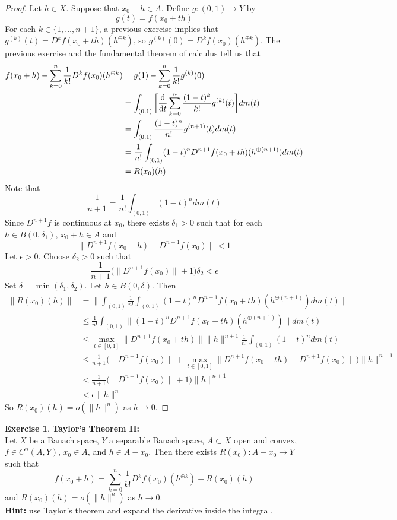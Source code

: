 \documentclass[12pt]{amsart}
\theoremstyle{definition}
\newtheorem{ex}[definition]{Exercise}
\newcommand{\del}{\delta}
\newcommand{\ep}{\epsilon}
\newcommand{\lex}[1]{\label{ex:#1}}
\begin{document}
	\begin{proof}
	Let $h \in X$. Suppose that $x_0 + h \in A$. Define $g: (0,1) \rightarrow Y$ by 
	$$g(t) = f(x_0 +t h)$$ 
	For each $k \in \{1, \dots, n+1\}$, a previous exercise implies that $g^{(k)}(t) = D^kf(x_0 + th)(h^{\oplus k})$, so $g^{(k)}(0) = D^kf(x_0)(h^{\oplus k})$. The previous exercise and the fundamental theorem of calculus tell us that 
	\begin{align*}
	f(x_0 +h) - \sum_{k=0}^{n} \frac{1}{k!}D^kf(x_0)(h^{\oplus k})
	&= g(1) - \sum_{k=0}^{n} \frac{1}{k!}g^{(k)}(0)\\
	&= \int_{(0,1)} \bigg [\dv{t} \sum_{k=0}^{n} \frac{(1-t)^k}{k!}g^{(k)}(t)\bigg ] dm(t) \\
	&= \int_{(0,1)} \frac{(1-t)^{n}}{n!}g^{(n+1)}(t) dm(t) \\
	&= \frac{1}{n!}\int_{(0,1)} (1-t)^{n}D^{n+1}f(x_0 + th)(h^{\oplus (n+1)})d m(t) \\
	&= R(x_0)(h)
	\end{align*}	
	Note that $$\frac{1}{n+1} = \frac{1}{n!}\int_{(0,1)} (1-t)^{n} dm(t)$$ 
	Since $D^{n+1}f$ is continuous at $x_0$, there exists $\del_1 >0$ such that for each $h \in B(0, \del_1)$, $x_0 + h \in A$ and 
	$$\|D^{n+1} f(x_0+h) - D^{n+1}f(x_0)\| < 1 $$  
	Let $\ep >0$. Choose $\del_2 >0$ such that $$\frac{1}{n+1} \bigg( \|D^{n+1}f(x_0 )\|  +  1 \bigg) \del_2 < \ep$$ Set $\del = \min(\del_1, \del_2)$. Let $h \in B(0, \del)$. Then
	\begin{align*}
	\|R(x_0)(h)\| 
	&= \bigg \| \int_{(0,1)} \frac{1}{n!}\int_{(0,1)} (1-t)^{n}D^{n+1}f(x_0 + th)(h^{\oplus (n+1)})d m(t) \bigg\| \\
	&\leq \frac{1}{n!}\int_{(0,1)} \|(1-t)^{n}D^{n+1}f(x_0 + th)(h^{\oplus (n+1)}) \|dm(t)\\
	&\leq \max_{t \in [0,1]}\|D^{n+1}f(x_0 + th)\| \|h\|^{n+1} \frac{1}{n!}\int_{(0,1)} (1-t)^{n} dm(t)  \\
	&\leq \frac{1}{n+1}  \bigg(\|D^{n+1}f(x_0 )\| +  \max_{t \in [0,1]} \|D^{n+1} f(x_0+th) - D^{n+1}f(x_0)\| \bigg)\|h\|^{n+1}  \\
	&< \frac{1}{n+1}\bigg(\|D^{n+1}f(x_0 )\|  +  1 \bigg)\|h\|^{n+1}  \\
	&<\ep \|h\|^n
	\end{align*}
	So $R(x_0)(h) = o(\|h\|^{n})$ as $h \rightarrow 0$.
	\end{proof}
	
	
	\begin{ex} \lex{} \textbf{Taylor's Theorem II:}\\
	Let $X$ be a Banach space, $Y$ a separable Banach space, $A \subset X$ open and convex, $f\in C^{n}(A, Y)$, $x_0 \in A$, and $h \in A - x_0$. Then there exists $R(x_0): A - x_0 \rightarrow Y$ such that $$f(x_0 + h) = \sum_{k=0}^{n} \frac{1}{k!} D^k f(x_0)(h^{\oplus k}) + R(x_0)(h)$$ and $R(x_0)(h) = o(\|h\|^n)$ as $ h \rightarrow 0$. \\
	\textbf{Hint:} use Taylor's theorem and expand the derivative inside the integral.
	\end{ex}
	
\end{document}
